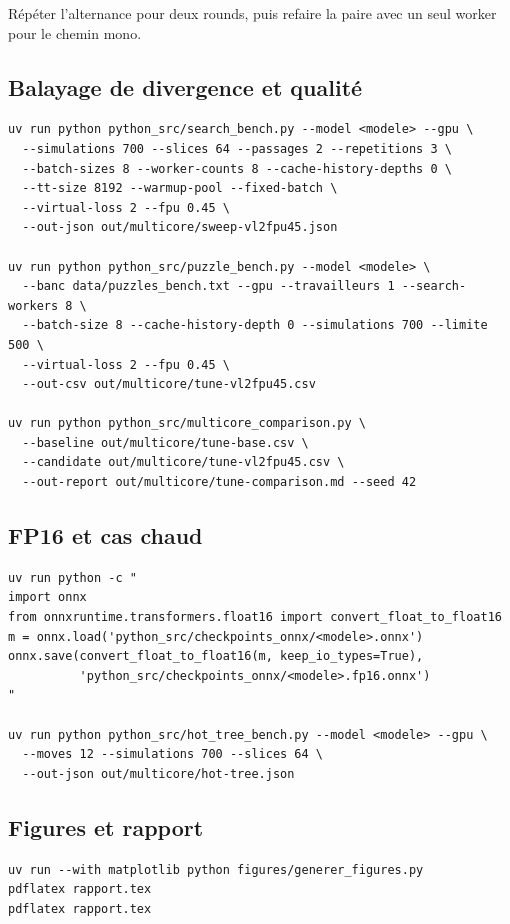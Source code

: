 R\'ep\'eter l'alternance pour deux rounds, puis refaire la paire avec un seul
worker pour le chemin mono.

\subsection{Balayage de divergence et qualit\'e}

\begin{lstlisting}[language={},caption={Balayage, tranches de 64.}]
uv run python python_src/search_bench.py --model <modele> --gpu \
  --simulations 700 --slices 64 --passages 2 --repetitions 3 \
  --batch-sizes 8 --worker-counts 8 --cache-history-depths 0 \
  --tt-size 8192 --warmup-pool --fixed-batch \
  --virtual-loss 2 --fpu 0.45 \
  --out-json out/multicore/sweep-vl2fpu45.json

uv run python python_src/puzzle_bench.py --model <modele> \
  --banc data/puzzles_bench.txt --gpu --travailleurs 1 --search-workers 8 \
  --batch-size 8 --cache-history-depth 0 --simulations 700 --limite 500 \
  --virtual-loss 2 --fpu 0.45 \
  --out-csv out/multicore/tune-vl2fpu45.csv

uv run python python_src/multicore_comparison.py \
  --baseline out/multicore/tune-base.csv \
  --candidate out/multicore/tune-vl2fpu45.csv \
  --out-report out/multicore/tune-comparison.md --seed 42
\end{lstlisting}

\subsection{FP16 et cas chaud}

\begin{lstlisting}[language={},caption={Conversion et cas chaud.}]
uv run python -c "
import onnx
from onnxruntime.transformers.float16 import convert_float_to_float16
m = onnx.load('python_src/checkpoints_onnx/<modele>.onnx')
onnx.save(convert_float_to_float16(m, keep_io_types=True),
          'python_src/checkpoints_onnx/<modele>.fp16.onnx')
"

uv run python python_src/hot_tree_bench.py --model <modele> --gpu \
  --moves 12 --simulations 700 --slices 64 \
  --out-json out/multicore/hot-tree.json
\end{lstlisting}

\subsection{Figures et rapport}

\begin{lstlisting}[language={},caption={Depuis le dossier du rapport.}]
uv run --with matplotlib python figures/generer_figures.py
pdflatex rapport.tex
pdflatex rapport.tex
\end{lstlisting}
